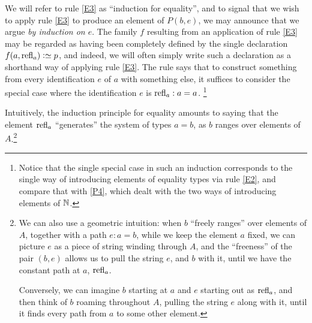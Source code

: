We will refer to rule \ref{E3} as ``induction for equality'', and to signal that we wish to apply rule \ref{E3} to produce
an element of $P(b,e)$, we may announce that we argue \emph{by induction on $e$}.
The family $f$ resulting from an application of rule \ref{E3} may be regarded as having been completely defined by the single declaration
$f(a,\refl a) \defeq p$,
and indeed, we will often simply write such a declaration as a shorthand way of applying rule \ref{E3}.
The rule says that to construct something from every identification $e$ of $a$ with something else,
it suffices to consider the special case where the identification $e$ is $\mathrm{refl}_{a} : a=a$.%
\footnote{Notice that the single special case in such an induction corresponds to the single way of introducing elements of
equality types via rule \ref{E2}, and compare that with \ref{P4}, which dealt with the two ways of introducing elements of $\mathbb{N}$.}

Intuitively, the induction principle for equality amounts to saying that the element $\mathrm{refl}_{a}$ ``generates'' the system of types $a=b$, as $b$
ranges over elements of $A$.\footnote{%
  We can also use a geometric intuition: when $b$ ``freely ranges'' over elements of $A$,
  together with a path $e : a=b$,
  while we keep the element $a$ fixed, we can picture $e$ as a piece of string
  winding through $A$, and the ``freeness'' of the pair $(b,e)$ allows us to pull the string $e$,
  and $b$ with it, until we have the constant path at $a$, $\mathrm{refl}_{a}$.\par
  Conversely, we can imagine $b$ starting at $a$ and $e$ starting out as $\mathrm{refl}_{a}$, and then think of $b$ roaming throughout $A$, pulling
  the string $e$ along with it, until it finds every path from $a$ to some other element.
}

